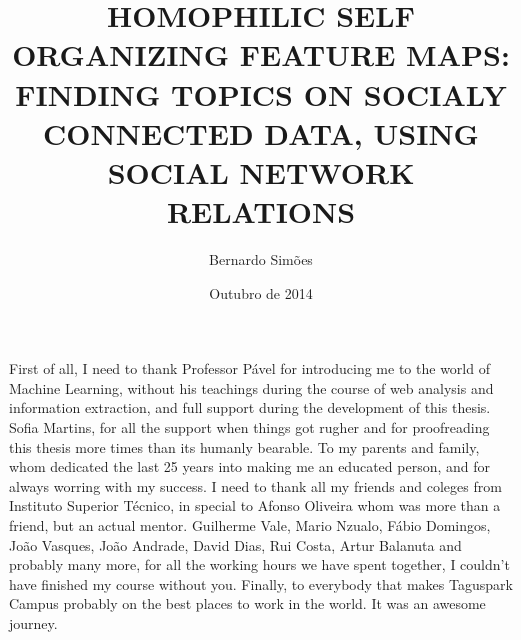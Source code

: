 

\title{HOMOPHILIC SELF ORGANIZING FEATURE MAPS: FINDING TOPICS ON SOCIALY CONNECTED DATA, USING SOCIAL NETWORK RELATIONS}

\author{Bernardo Simões}


\date{Outubro de 2014}



\maketitle
\clearpage

\thispagestyle{empty}
\cleardoublepage

\setcounter{page}{1} 

\baselineskip 18pt %
 
\begin{acknowledgments}
  First of all, I need to thank Professor Pável for introducing me to the world of Machine Learning, without his teachings during the course of web analysis and information extraction, and full support during the development of this thesis. 
  Sofia Martins, for all the support when things got rugher and for proofreading this thesis more times than its humanly bearable.
  To my parents and family, whom dedicated the last 25 years into making me an educated person, and for always worring with my success.
  I need to thank all my friends and coleges from Instituto Superior Técnico, in special to Afonso Oliveira whom was more than a friend, but an actual mentor. Guilherme Vale, Mario Nzualo, Fábio Domingos, João Vasques, João Andrade, David Dias, Rui Costa, Artur Balanuta and probably many more, for all the working hours we have spent together, I couldn't have finished my course without you.
  Finally, to everybody that makes Taguspark Campus probably on the best places to work in the world. It was an awesome journey.
\end{acknowledgments}
 
